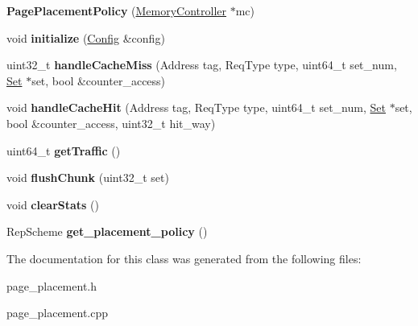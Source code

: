 \begin{DoxyCompactItemize}
\item 
\hypertarget{classPagePlacementPolicy_a10c38deeeebc5cced0e2589f70c508a1}{{\bfseries Page\-Placement\-Policy} (\hyperlink{classMemoryController}{Memory\-Controller} $\ast$mc)}\label{classPagePlacementPolicy_a10c38deeeebc5cced0e2589f70c508a1}

\item 
\hypertarget{classPagePlacementPolicy_af2da8404147f8ad8fda9a1c01db8c9f3}{void {\bfseries initialize} (\hyperlink{classConfig}{Config} \&config)}\label{classPagePlacementPolicy_af2da8404147f8ad8fda9a1c01db8c9f3}

\item 
\hypertarget{classPagePlacementPolicy_aa4e62dec9a5828d9d09fc25d5c6e200d}{uint32\-\_\-t {\bfseries handle\-Cache\-Miss} (Address tag, Req\-Type type, uint64\-\_\-t set\-\_\-num, \hyperlink{classSet}{Set} $\ast$set, bool \&counter\-\_\-access)}\label{classPagePlacementPolicy_aa4e62dec9a5828d9d09fc25d5c6e200d}

\item 
\hypertarget{classPagePlacementPolicy_a1e634d46b746bf65a82a406a242e3daa}{void {\bfseries handle\-Cache\-Hit} (Address tag, Req\-Type type, uint64\-\_\-t set\-\_\-num, \hyperlink{classSet}{Set} $\ast$set, bool \&counter\-\_\-access, uint32\-\_\-t hit\-\_\-way)}\label{classPagePlacementPolicy_a1e634d46b746bf65a82a406a242e3daa}

\item 
\hypertarget{classPagePlacementPolicy_ab3ce2f295e6cc109d9071d98a7cdbaa4}{uint64\-\_\-t {\bfseries get\-Traffic} ()}\label{classPagePlacementPolicy_ab3ce2f295e6cc109d9071d98a7cdbaa4}

\item 
\hypertarget{classPagePlacementPolicy_a425fd492d861b3f9e1b62feaf01da14e}{void {\bfseries flush\-Chunk} (uint32\-\_\-t set)}\label{classPagePlacementPolicy_a425fd492d861b3f9e1b62feaf01da14e}

\item 
\hypertarget{classPagePlacementPolicy_a322b52d537c85fdaaaa3549322c95ddc}{void {\bfseries clear\-Stats} ()}\label{classPagePlacementPolicy_a322b52d537c85fdaaaa3549322c95ddc}

\item 
\hypertarget{classPagePlacementPolicy_a29e6b35538cc52d8fe1d901dc0f33cab}{Rep\-Scheme {\bfseries get\-\_\-placement\-\_\-policy} ()}\label{classPagePlacementPolicy_a29e6b35538cc52d8fe1d901dc0f33cab}

\end{DoxyCompactItemize}


The documentation for this class was generated from the following files\-:\begin{DoxyCompactItemize}
\item 
page\-\_\-placement.\-h\item 
page\-\_\-placement.\-cpp\end{DoxyCompactItemize}
